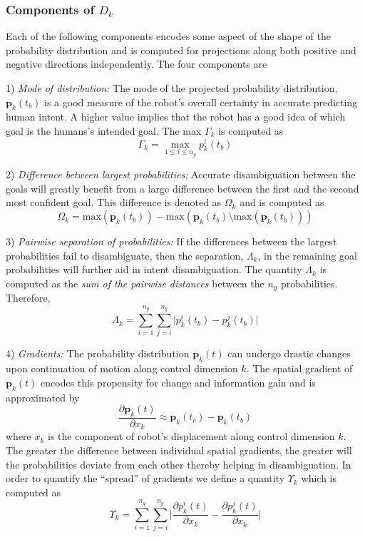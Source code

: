 \subsubsection{Components of $D_k$}\label{sssec:components}
Each of the following components encodes some aspect of the shape of the probability distribution and is computed for projections along both positive and negative directions independently. The four components are

1) \textit{Mode of distribution:} The mode of the projected probability distribution, $\boldsymbol{p}_k(t_b)$  is a good measure of the robot's overall certainty in accurate predicting human intent. A higher value implies that the robot has a good idea of which goal is the humans's intended goal. The max $\Gamma_k$ is computed as
\begin{equation*}
\Gamma_k = \max\limits_{1 \leq i \leq n_g}p^i_k(t_b)
\end{equation*}

2) \textit{Difference between largest probabilities:} Accurate disambiguation between the goals will greatly benefit from a large difference between the first and the second most confident goal. This difference is denoted as $\Omega_k$ and is computed as
\begin{equation*}
\Omega_k = \text{max}(\boldsymbol{p}_k(t_b)) - \text{max}(\boldsymbol{p}_k(t_b) \setminus \text{max}(\boldsymbol{p}_k(t_b)))
\end{equation*}

3) \textit{Pairwise separation of probabilities:} If the differences between the largest probabilities fail to disambiguate, then the separation, $\Lambda_k$, in the remaining goal probabilities will further aid in intent disambiguation. The quantity $\Lambda_k$ is computed as the \textit{sum of the pairwise distances} between the $n_g$ probabilities. Therefore, 
\begin{equation*}
\Lambda_k = \sum_{i=1}^{n_g}\sum_{j=i}^{n_g}\lvert p^i_k(t_b) - p^j_k(t_b)\rvert
\end{equation*}

4) \textit{Gradients:} The probability distribution $\boldsymbol{p}_k(t)$ can undergo drastic changes upon continuation of motion along control dimension $k$. The spatial gradient of $\boldsymbol{p}_k(t)$ encodes this propensity for change and information gain and is approximated by 
\begin{equation*}
\frac{\partial\boldsymbol{p}_k(t)}{\partial x_k} \approx \boldsymbol{p}_k(t_c) - \boldsymbol{p}_k(t_b)
\end{equation*}
where $x_k$ is the component of robot's displacement along control dimension $k$. The greater the difference between individual spatial gradients, the greater will the probabilities deviate from each other thereby helping in disambiguation. In order to quantify the ``spread'' of gradients we define a quantity $\Upsilon_k$ which is computed as 
\begin{equation*}
\Upsilon_k = \sum_{i=1}^{n_g}\sum_{j=i}^{n_g}\Big \lvert\frac{\partial p^i_k(t)}{\partial x_k} - \frac{\partial p^j_k(t)}{\partial x_k}\Big \rvert
\end{equation*}

